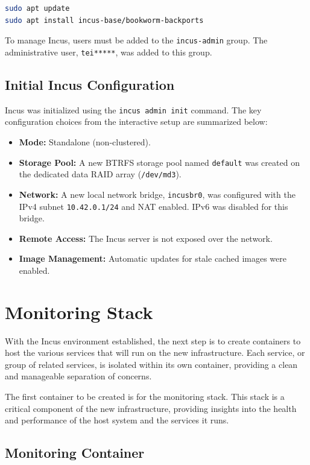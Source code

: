 \begin{lstlisting}[language=bash,caption={Installing the Incus server from Debian backports.}]
sudo apt update
sudo apt install incus-base/bookworm-backports
\end{lstlisting}

To manage Incus, users must be added to the \texttt{incus-admin} group. The administrative user, \texttt{tei*****}, was added to this group.

\subsection*{Initial Incus Configuration}

Incus was initialized using the \texttt{incus admin init} command. The key configuration choices from the interactive setup are summarized below:
\begin{itemize}
    \item \textbf{Mode:} Standalone (non-clustered).
    \item \textbf{Storage Pool:} A new BTRFS storage pool named \texttt{default} was created on the dedicated data RAID array (\texttt{/dev/md3}).
    \item \textbf{Network:} A new local network bridge, \texttt{incusbr0}, was configured with the IPv4 subnet \texttt{10.42.0.1/24} and NAT enabled. IPv6 was disabled for this bridge.
    \item \textbf{Remote Access:} The Incus server is not exposed over the network.
    \item \textbf{Image Management:} Automatic updates for stale cached images were enabled.
\end{itemize}

\section{Monitoring Stack}

With the Incus environment established, the next step is to create containers to host the various services that will run on the new infrastructure. Each service, or group of related services, is isolated within its own container, providing a clean and manageable separation of concerns.

The first container to be created is for the monitoring stack. This stack is a critical component of the new infrastructure, providing insights into the health and performance of the host system and the services it runs.

\subsection*{Monitoring Container}

